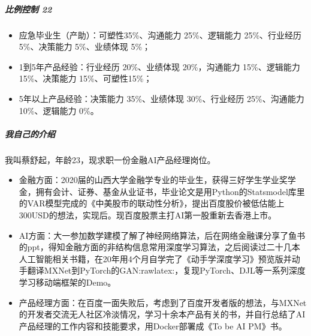 \documentclass[letterpaper,10pt,english]{sphinxmanual}
\begin{document}
\subparagraph{比例控制 22\sphinxfootnotemark[859]}
\label{\detokenize{chapter_interview/question:id5}}%
\begin{footnotetext}[859]\sphinxAtStartFootnote
{}
%
\end{footnotetext}\ignorespaces \begin{itemize}
\item {} 
应急毕业生（产助）：可塑性35\%、沟通能力 25\%、逻辑能力 25\%、行业经历
5\%、决策能力 5\%、业绩体现 5\%；

\item {} 
1到5年产品经验：行业经历 20\%、业绩体现 20\%，沟通能力
15\%、逻辑能力15\%、决策能力 15\%、可塑性15\%；

\item {} 
5年以上产品经验：决策能力 35\%、业绩体现 30\%、行业经历 25\%、沟通能力
10\%、逻辑能力 0\%。

\end{itemize}


\subparagraph{我自己的介绍}
\label{\detokenize{chapter_interview/question:id6}}
我叫蔡舒起，年龄23，现求职一份金融AI产品经理岗位。
\begin{itemize}
\item {} 
金融方面：2020届的山西大学金融学专业的毕业生，获得三好学生学业奖学金，拥有会计、证券、基金从业证书，毕业论文是用Python的Statsmodel库里的VAR模型完成的《中美股市的联动性分析》，提出百度股价被低估能上300USD的想法，实现后。现百度股票主打AI第一股重新去香港上市。

\item {} 
AI方面：大一参加数学建模了解了神经网络算法，后在网络金融课分享了鱼书的ppt，得知金融方面的非结构信息常用深度学习算法，之后阅读过二十几本人工智能相关书籍，在20年用4个月自学完了《动手学深度学习》预览版并动手翻译MXNet到PyTorch的GAN:raw\sphinxhyphen{}latex:，复现PyTorch、DJL等一系列深度学习移动端框架的Demo。

\item {} 
产品经理方面：在百度一面失败后，考虑到了百度开发者版的想法，与MXNet的开发者交流无人社区冷淡情况，学习十余本产品有关的书，并自行总结了AI产品经理的工作内容和技能要求，用Docker部署成《To
be AI PM》书。

\end{itemize}
\end{document}

